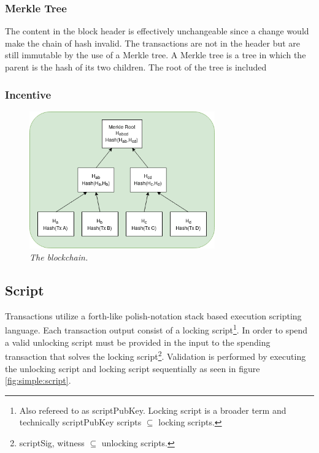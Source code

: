 \subsubsection{Merkle Tree}

The content in the block header is effectively unchangeable since a change would make the chain of hash invalid. The transactions are not in the header but are still immutable by the use of a Merkle tree. A Merkle tree is a tree in which the parent is the hash of its two children. The root of the tree is included 

\subsubsection{Incentive}

\begin{figure}[!htb]

	\centering
	\includegraphics[width=8cm]{merkle.png}
	\caption{\textit{The blockchain. 
	}}
	\label{fig:merkle:tree}

\end{figure}

\subsection{Script}

Transactions utilize a forth-like polish-notation stack based execution scripting language\cite{antonopoulos:mastering:bitcoin}. Each transaction output consist of a locking script\footnote{Also refereed to as scriptPubKey. Locking script is a broader term and technically scriptPubKey scripts $ \subseteq $ locking scripts.}. In order to spend a valid unlocking script must be provided in the input to the spending transaction that solves the locking script\footnote{scriptSig, witness $\subseteq $ unlocking scripts.}. Validation is performed by executing the unlocking script and locking script sequentially as seen in figure \ref{fig:simple:script}. 

